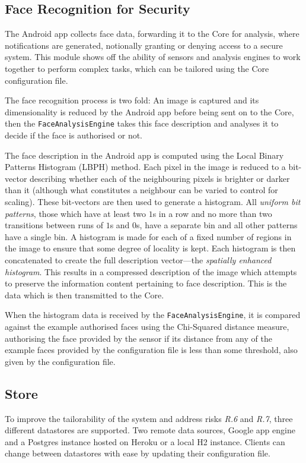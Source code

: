 \documentclass[10pt,a4paper]{article}
\begin{document}
\subsection{Face Recognition for Security}
The Android app collects face data, forwarding it to the Core for analysis, where notifications are generated, notionally granting or denying access to a secure system. This module shows off the ability of sensors and analysis engines to work together to perform complex tasks, which can be tailored using the Core configuration file.

The face recognition process is two fold: An image is captured and its dimensionality is reduced by the Android app before being sent on to the Core, then the \texttt{FaceAnalysisEngine} takes this face description and analyses it to decide if the face is authorised or not.

The face description in the Android app is computed using the Local Binary Patterns Histogram (LBPH) \cite{ahonen2006face} method. Each pixel in the image is reduced to a bit-vector describing whether each of the neighbouring pixels is brighter or darker than it (although what constitutes a neighbour can be varied to control for scaling). These bit-vectors are then used to generate a histogram. All \emph{uniform bit patterns}, those which have at least two $1$s in a row and no more than two transitions between runs of $1$s and $0$s, have a separate bin and all other patterns have a single bin. A histogram is made for each of a fixed number of regions in the image to ensure that some degree of locality is kept. Each histogram is then concatenated to create the full description vector---the \emph{spatially enhanced histogram}. This results in a compressed description of the image which attempts to preserve the information content pertaining to face description. This is the data which is then transmitted to the Core.

When the histogram data is received by the \texttt{FaceAnalysisEngine}, it is compared against the example authorised faces using the Chi-Squared distance measure, authorising the face provided by the sensor if its distance from any of the example faces provided by the configuration file is less than some threshold, also given by the configuration file.



\subsection{Store}
\label{sec:store}
To improve the tailorability of the system and address risks \emph{R.6} and \emph{R.7}, three different datastores are supported. Two remote data sources, Google app engine and a Postgres instance hosted on Heroku or a local H2 instance. Clients can change between datastores with ease by updating their configuration file.
\end{document}
